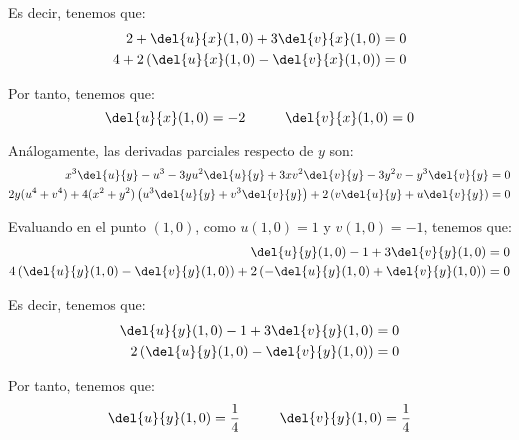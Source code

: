\begin{ejercicio}
    Es decir, tenemos que:
    \begin{align*}
        2 + \del{u}{x}(1,0) + 3\del{v}{x}(1,0) &= 0 \\
        4 + 2\left(\del{u}{x}(1,0) - \del{v}{x}(1,0)\right) &= 0
    \end{align*}

    Por tanto, tenemos que:
    \begin{equation*}
        \del{u}{x}(1,0) = -2 \hspace{1cm}
        \del{v}{x}(1,0) = 0
    \end{equation*}

    Análogamente, las derivadas parciales respecto de $y$ son:
    \begin{align*}
        x^3\del{u}{y} -u^3  -3yu^2\del{u}{y} + 3xv^2\del{v}{y} -3y^2v - y^3\del{v}{y} &= 0 \\
        2y(u^4+v^4) + 4(x^2+y^2)\left(u^3\del{u}{y} + v^3\del{v}{y}\right) + 2\left(v\del{u}{y} + u\del{v}{y}\right) &= 0
    \end{align*}

    Evaluando en el punto $(1,0)$, como $u(1,0)=1$ y $v(1,0)=-1$, tenemos que:
    \begin{align*}
        \del{u}{y}(1,0) -1 + 3\del{v}{y}(1,0) &= 0 \\
        4\left(\del{u}{y}(1,0) -\del{v}{y}(1,0)\right) + 2\left(-\del{u}{y}(1,0) + \del{v}{y}(1,0)\right) &= 0
    \end{align*}

    Es decir, tenemos que:
    \begin{align*}
        \del{u}{y}(1,0) -1 + 3\del{v}{y}(1,0) &= 0 \\
        2\left(\del{u}{y}(1,0) -\del{v}{y}(1,0)\right) &= 0
    \end{align*}

    Por tanto, tenemos que:
    \begin{equation*}
        \del{u}{y}(1,0) = \frac{1}{4} \hspace{1cm}
        \del{v}{y}(1,0) = \frac{1}{4}
    \end{equation*}
\end{ejercicio}


